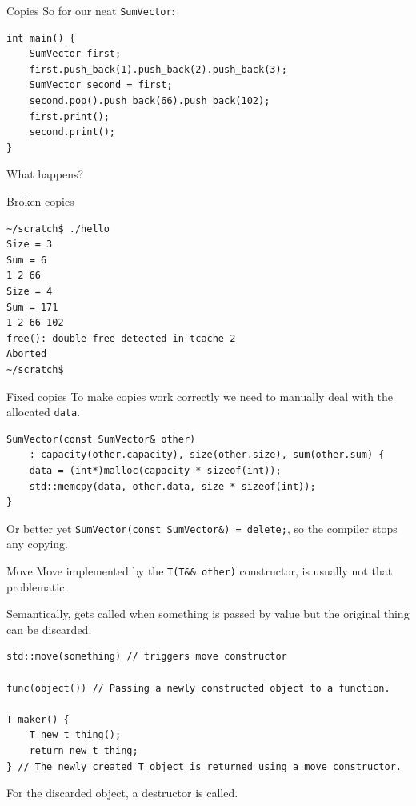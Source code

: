 \documentclass[11pt, aspectratio=169, table]{beamer}
\begin{document}
\begin{frame}[fragile]{Copies}
So for our neat \texttt{SumVector}:

\begin{verbatim}
int main() {
    SumVector first;
    first.push_back(1).push_back(2).push_back(3);
    SumVector second = first;
    second.pop().push_back(66).push_back(102);
    first.print();
    second.print();
}
\end{verbatim}

What happens?
\end{frame}

\begin{frame}[fragile]{Broken copies}
\begin{verbatim}
~/scratch$ ./hello
Size = 3
Sum = 6
1 2 66
Size = 4
Sum = 171
1 2 66 102
free(): double free detected in tcache 2
Aborted
~/scratch$
\end{verbatim}
\end{frame}

\begin{frame}[fragile]{Fixed copies}
To make copies work correctly we need to manually deal with the allocated \texttt{data}.

\begin{verbatim}
SumVector(const SumVector& other)
    : capacity(other.capacity), size(other.size), sum(other.sum) {
    data = (int*)malloc(capacity * sizeof(int));
    std::memcpy(data, other.data, size * sizeof(int));
}
\end{verbatim}

Or better yet \texttt{SumVector(const SumVector&) = delete;}, so the compiler stops any copying.
\end{frame}

\begin{frame}[fragile]{Move}
Move implemented by the \texttt{T(T&& other)} constructor, is usually not that problematic.

Semantically, gets called when something is passed by value but the original thing can be discarded.

\begin{verbatim}
std::move(something) // triggers move constructor

func(object()) // Passing a newly constructed object to a function.

T maker() {
    T new_t_thing();
    return new_t_thing;
} // The newly created T object is returned using a move constructor.
\end{verbatim}

For the discarded object, a \alert{destructor is called}.
\end{frame}
\end{document}
